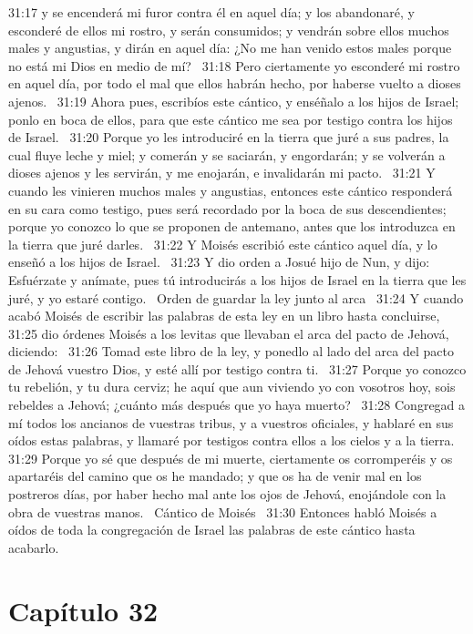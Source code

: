 31:17 y se encenderá mi furor contra él en aquel día; y los abandonaré, y esconderé de ellos mi rostro, y serán consumidos; y vendrán sobre ellos muchos males y angustias, y dirán en aquel día: ¿No me han venido estos males porque no está mi Dios en medio de mí?  
31:18 Pero ciertamente yo esconderé mi rostro en aquel día, por todo el mal que ellos habrán hecho, por haberse vuelto a dioses ajenos.  
31:19 Ahora pues, escribíos este cántico, y enséñalo a los hijos de Israel; ponlo en boca de ellos, para que este cántico me sea por testigo contra los hijos de Israel.  
31:20 Porque yo les introduciré en la tierra que juré a sus padres, la cual fluye leche y miel; y comerán y se saciarán, y engordarán; y se volverán a dioses ajenos y les servirán, y me enojarán, e invalidarán mi pacto.  
31:21 Y cuando les vinieren muchos males y angustias, entonces este cántico responderá en su cara como testigo, pues será recordado por la boca de sus descendientes; porque yo conozco lo que se proponen de antemano, antes que los introduzca en la tierra que juré darles.  
31:22 Y Moisés escribió este cántico aquel día, y lo enseñó a los hijos de Israel.  
31:23 Y dio orden a Josué hijo de Nun, y dijo: Esfuérzate y anímate, pues tú introducirás a los hijos de Israel en la tierra que les juré, y yo estaré contigo.  
Orden de guardar la ley junto al arca  
31:24 Y cuando acabó Moisés de escribir las palabras de esta ley en un libro hasta concluirse,  
31:25 dio órdenes Moisés a los levitas que llevaban el arca del pacto de Jehová, diciendo:  
31:26 Tomad este libro de la ley, y ponedlo al lado del arca del pacto de Jehová vuestro Dios, y esté allí por testigo contra ti.  
31:27 Porque yo conozco tu rebelión, y tu dura cerviz; he aquí que aun viviendo yo con vosotros hoy, sois rebeldes a Jehová; ¿cuánto más después que yo haya muerto?  
31:28 Congregad a mí todos los ancianos de vuestras tribus, y a vuestros oficiales, y hablaré en sus oídos estas palabras, y llamaré por testigos contra ellos a los cielos y a la tierra.  
31:29 Porque yo sé que después de mi muerte, ciertamente os corromperéis y os apartaréis del camino que os he mandado; y que os ha de venir mal en los postreros días, por haber hecho mal ante los ojos de Jehová, enojándole con la obra de vuestras manos.  
Cántico de Moisés  
31:30 Entonces habló Moisés a oídos de toda la congregación de Israel las palabras de este cántico hasta acabarlo.  
\section*{Capítulo 32 }

